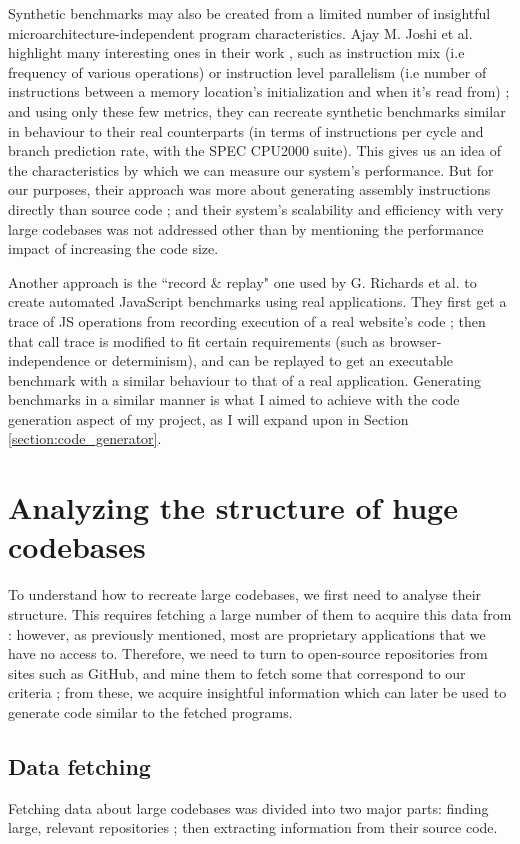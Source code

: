 \documentclass[12pt]{article}
\begin{document}
\bigskip
Synthetic benchmarks may also be created from a limited number of insightful microarchitecture-independent program characteristics. Ajay M. Joshi et al. highlight many interesting ones in their work \cite{return-of-synthetic-benchmarks}, such as instruction mix (i.e frequency of various operations) or instruction level parallelism (i.e number of instructions between a memory location's initialization and when it's read from) ; and using only these few metrics, they can recreate synthetic benchmarks similar in behaviour to their real counterparts (in terms of instructions per cycle and branch prediction rate, with the SPEC CPU2000 suite). This gives us an idea of the characteristics by which we can measure our system's performance. But for our purposes, their approach was more about generating assembly instructions directly than source code ; and their system's scalability and efficiency with very large codebases was not addressed other than by mentioning the performance impact of increasing the code size.

\bigskip
Another approach is the ``record \& replay" one used by G. Richards et al. to create automated JavaScript benchmarks \cite{automated_js_benchmarks} using real applications. They first get a trace of JS operations from recording execution of a real website's code ; then that call trace is modified to fit certain requirements (such as browser-independence or determinism), and can be replayed to get an executable benchmark with a similar behaviour to that of a real application. Generating benchmarks in a similar manner is what I aimed to achieve with the code generation aspect of my project, as I will expand upon in Section \ref{section:code_generator}.

\newpage
\section{Analyzing the structure of huge codebases}
To understand how to recreate large codebases, we first need to analyse their structure. This requires fetching a large number of them to acquire this data from : however, as previously mentioned, most are proprietary applications that we have no access to. Therefore, we need to turn to open-source repositories from sites such as GitHub, and mine them to fetch some that correspond to our criteria ; from these, we acquire insightful information which can later be used to generate code similar to the fetched programs.

\subsection{Data fetching}
Fetching data about large codebases was divided into two major parts: finding large, relevant repositories ; then extracting information from their source code.
\end{document}
